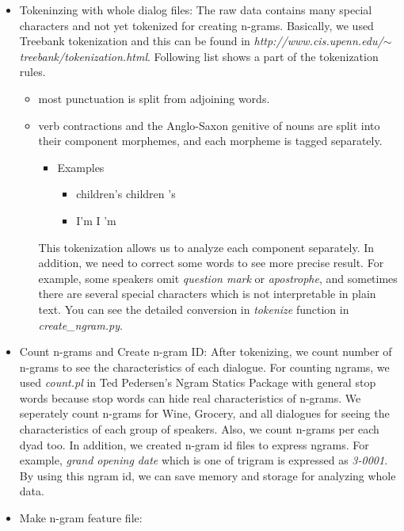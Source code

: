 \documentclass[11pt]{article} %
\begin{document}
\begin{itemize}
\item Tokeninzing with whole dialog files: \newline
The raw data contains many special characters and not yet tokenized for creating n-grams. Basically, we used Treebank tokenization and this can be found in \textit{http://www.cis.upenn.edu/$\sim$treebank/tokenization.html}. Following list shows a part of the tokenization rules.
\begin{itemize}
\item most punctuation is split from adjoining words.
\item verb contractions and the Anglo-Saxon genitive of nouns are split into their component morphemes, and each morpheme is tagged separately.
\begin{itemize}
\item Examples
\begin{itemize}
\item children's \textrightarrow children 's
\item I'm \textrightarrow I 'm
\end{itemize}
\end{itemize}
This tokenization allows us to analyze each component separately.\newline
In addition, we need to correct some words to see more precise result. For example, some speakers omit \textit{question mark} or \textit{apostrophe}, and sometimes there are several special characters which is not interpretable in plain text. You can see the detailed conversion in \textit{tokenize} function in \textit{create\_ngram.py}.
\end{itemize}
\item Count n-grams and Create n-gram ID:\newline
After tokenizing, we count number of n-grams to see the characteristics of each dialogue. For counting ngrams, we used \textit{count.pl} in Ted Pedersen’s Ngram Statics Package with general stop words because stop words can hide real characteristics of n-grams. We seperately count n-grams for Wine, Grocery, and all dialogues for seeing the characteristics of each group of speakers. Also, we count n-grams per each dyad too. \newline
In addition, we created n-gram id files to express ngrams. For example, \textit{grand opening date} which is one of trigram is expressed as \textit{3-0001}. By using this ngram id, we can save memory and storage for analyzing whole data.
\item Make n-gram feature file:\newline

\end{itemize}
\end{document}
